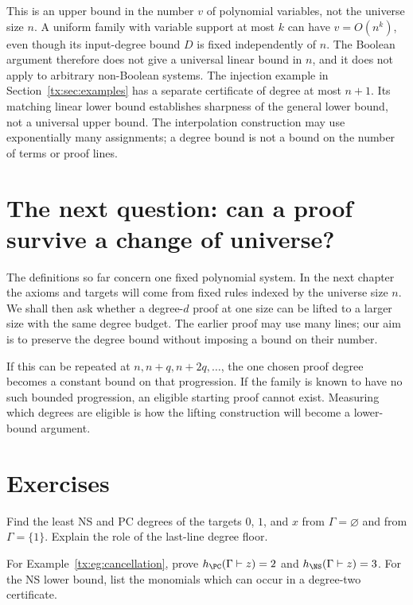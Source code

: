 This is an upper bound in the number $v$ of polynomial variables,
not the universe size $n$. A uniform family with variable support at
most $k$ can have $v=O(n^k)$, even though its input-degree bound $D$
is fixed independently of $n$. The Boolean argument therefore does
not give a universal linear bound in $n$, and it does not apply to
arbitrary non-Boolean systems. The injection example in
Section~\ref{tx:sec:examples} has a separate certificate of degree
at most $n+1$. Its matching linear lower bound establishes sharpness
of the general lower bound, not a universal upper bound.
The interpolation construction may use exponentially many assignments;
a degree bound is not a bound on the number of terms or proof lines.

\section{The next question: can a proof survive a change of universe?}
The definitions so far concern one fixed polynomial system. In the
next chapter the axioms and targets will come from fixed rules indexed
by the universe size $n$. We shall then ask whether a degree-$d$ proof
at one size can be lifted to a larger size with the same degree budget.
The earlier proof may use many lines; our aim is to preserve the
degree bound without imposing a bound on their number.

If this can be repeated at $n,n+q,n+2q,\ldots$, the one chosen proof
degree becomes a constant bound on that progression. If the family
is known to have no such bounded progression, an eligible starting
proof cannot exist. Measuring which degrees are eligible is how the
lifting construction will become a lower-bound argument.

\section{Exercises}
\begin{exercise}\label{tx:ex:zero-constant}
Find the least NS and PC degrees of the targets $0$, $1$, and $x$ from
$\Gamma=\varnothing$ and from $\Gamma=\{1\}$. Explain the role of the
last-line degree floor.
\end{exercise}
\par\medskip

\begin{exercise}\label{tx:ex:small-gap}
For Example~\ref{tx:eg:cancellation}, prove
$h_{\PC}(\Gamma\vdash z)=2$ and
$h_{\NS}(\Gamma\vdash z)=3$. For the NS lower bound, list the monomials
which can occur in a degree-two certificate.
\end{exercise}
\par\medskip

